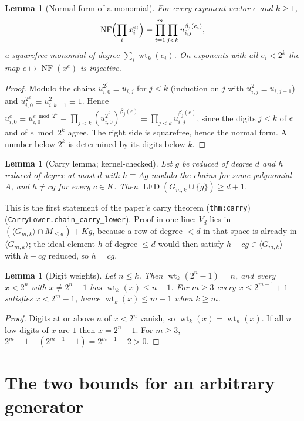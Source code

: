 \documentclass[11pt]{article}
\newcommand{\lfd}{\operatorname{LFD}}
\newcommand{\NF}{\operatorname{NF}}
\newcommand{\wt}{\operatorname{wt}}
\newcommand{\code}[1]{\texttt{#1}}
\newtheorem{lemma}[theorem]{Lemma}
\theoremstyle{definition}
\theoremstyle{remark}
\begin{document}
\begin{lemma}[Normal form of a monomial]\label{lem:nf}
For every exponent vector $e$ and $k\ge1$,
\[
 \NF\Bigl(\prod_i x_i^{e_i}\Bigr)=\prod_{i=1}^m\prod_{j<k}u_{i,j}^{\beta_j(e_i)} ,
\]
a squarefree monomial of degree $\sum_i\wt_k(e_i)$. On exponents with all
$e_i<2^k$ the map $e\mapsto\NF(x^e)$ is injective.
\end{lemma}
\begin{proof}
Modulo the chains $u_{i,0}^{2^j}\equiv u_{i,j}$ for $j<k$ (induction on $j$
with $u_{i,j}^2\equiv u_{i,j+1}$) and $u_{i,0}^{2^k}\equiv u_{i,k-1}^2\equiv1$.
Hence $u_{i,0}^{e}\equiv u_{i,0}^{e\bmod 2^k}=\prod_{j<k}(u_{i,0}^{2^j})^{\beta_j(e)}
\equiv\prod_{j<k}u_{i,j}^{\beta_j(e)}$, since the digits $j<k$ of $e$ and of
$e\bmod2^k$ agree. The right side is squarefree, hence the normal form. A
number below $2^k$ is determined by its digits below $k$.
\end{proof}

\begin{lemma}[Carry lemma; kernel-checked]\label{lem:carry}
Let $g$ be reduced of degree $d$ and $h$ reduced of degree at most $d$ with
$h\equiv A g$ modulo the chains for some polynomial $A$, and $h\ne cg$ for
every $c\in K$. Then $\lfd(G_{m,k}\cup\{g\})\ge d+1$.
\end{lemma}
This is the first statement of the paper's carry theorem (\code{thm:carry})
(\code{CarryLower.chain\_carry\_lower}). Proof in one line: $V_d$ lies in
$(\langle G_{m,k}\rangle\cap M_{\le d})+Kg$, because a row of degree $<d$
in that space is already in $\langle G_{m,k}\rangle$; the ideal element $h$
of degree $\le d$ would then satisfy $h-cg\in\langle G_{m,k}\rangle$ with
$h-cg$ reduced, so $h=cg$.

\begin{lemma}[Digit weights]\label{lem:weights}
Let $n\le k$. Then $\wt_k(2^n-1)=n$, and every $x<2^n$ with $x\ne2^n-1$ has
$\wt_k(x)\le n-1$. For $m\ge3$ every $x\le2^{m-1}+1$ satisfies
$x<2^m-1$, hence $\wt_k(x)\le m-1$ when $k\ge m$.
\end{lemma}
\begin{proof}
Digits at or above $n$ of $x<2^n$ vanish, so $\wt_k(x)=\wt_n(x)$. If all
$n$ low digits of $x$ are $1$ then $x=2^n-1$. For $m\ge3$,
$2^m-1-(2^{m-1}+1)=2^{m-1}-2>0$.
\end{proof}

\section{The two bounds for an arbitrary generator}
\end{document}

